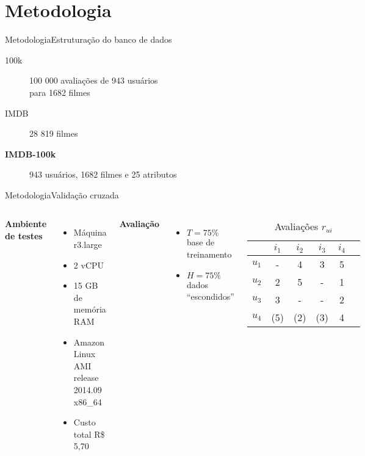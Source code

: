 \section[Metodologia]{Metodologia}
\begin{frame}{Metodologia}{Estruturação do banco de dados}

\begin{description}
	\item[100k] 100 000 avaliações de 943 usuários \\ para 1682 filmes
	\item[IMDB] 28 819 filmes
	\item[\textbf{IMDB-100k}] 943 usuários, 1682 filmes e 25 atributos
\end{description}

\end{frame}


\begin{frame}{Metodologia}{Validação cruzada}
\begin{columns}[t] 
\textbf{Ambiente de testes} 
\begin{itemize}
 	\item Máquina r3.large
 	\item 2 vCPU
 	\item 15 GB de memória RAM
 	\item Amazon Linux AMI release 2014.09 x86\_64
 	\item Custo total R\$ 5,70
 \end{itemize}
\textbf{Avaliação}
\begin{itemize}
	\item $T=75\%$ base de treinamento
	\item $H=75\%$ dados ``escondidos''
\end{itemize}
\begin{table}[h]
\begin{center}
	\caption{Avaliações $r_{ui}$}
    \begin{tabular}{ | c | c | c | c | c | c |} 
    \hline
     & $i_1$ & $i_2$ & $i_3$ & $i_4$ \\ \hline
     $u_1$ & - & 4 & 3 & 5 \\ \hline
     $u_2$ & 2 & 5 & - & 1 \\ \hline
     $u_3$ & 3 & - & - & 2 \\ \hline
     $u_4$ & (5) & (2) & (3) & 4 \\ \hline
    \end{tabular}
\end{center}
\end{table}
\end{columns}
\end{frame}